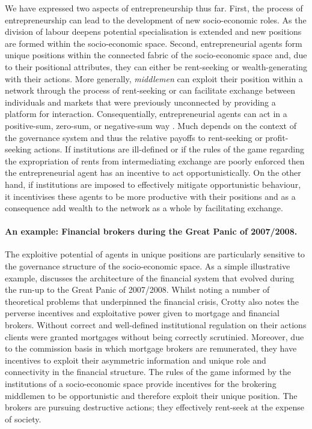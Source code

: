 We have expressed two aspects of entrepreneurship thus far. First, the process of entrepreneurship can lead to the development of new socio-economic roles. As the division of labour deepens potential specialisation is extended and new positions are formed within the socio-economic space. Second, entrepreneurial agents form unique positions within the connected fabric of the socio-economic space and, due to their positional attributes, they can either be rent-seeking or wealth-generating with their actions. More generally, \emph{middlemen} can exploit their position within a network through the process of rent-seeking or can facilitate exchange between individuals and markets that were previously unconnected by providing a platform for interaction. Consequentially, entrepreneurial agents can act in a positive-sum, zero-sum, or negative-sum way \citep{Krakovsky2015}. Much depends on the context of the governance system and thus the relative payoffs to rent-seeking or profit-seeking actions. If institutions are ill-defined or if the rules of the game regarding the expropriation of rents from intermediating exchange are poorly enforced then the entrepreneurial agent has an incentive to act opportunistically. On the other hand, if institutions are imposed to effectively mitigate opportunistic behaviour, it incentivises these agents to be more productive with their positions and as a consequence add wealth to the network as a whole by facilitating exchange.
\begin{framed}
\paragraph{An example: Financial brokers during the Great Panic of 2007/2008.} The exploitive potential of agents in unique positions are particularly sensitive to the governance structure of the socio-economic space. As a simple illustrative example, \citet{Crotty2009} discusses the architecture of the financial system that evolved during the run-up to the Great Panic of 2007/2008. Whilst noting a number of theoretical problems that underpinned the financial crisis, Crotty also notes the perverse incentives and exploitative power given to mortgage and financial brokers. Without correct and well-defined institutional regulation on their actions clients were granted mortgages without being correctly scrutinied. Moreover, due to the commission basis in which mortgage brokers are remunerated, they have incentives to exploit their asymmetric information and unique role and connectivity in the financial structure. The rules of the game informed by the institutions of a socio-economic space provide incentives for the brokering middlemen to be opportunistic and therefore exploit their unique position. The brokers are pursuing destructive actions; they effectively rent-seek at the expense of society.
\end{framed}
